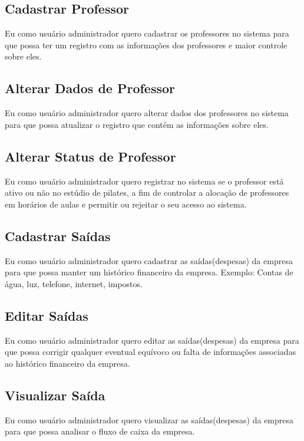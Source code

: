 \subsection[Cadastrar Professor]{Cadastrar Professor}
Eu como usuário administrador quero cadastrar os professores no sistema para
que possa ter um registro com as informações dos professores e maior controle
sobre eles.

\subsection[Alterar Dados de Professor]{Alterar Dados de Professor}
Eu como usuário administrador quero alterar dados dos professores no sistema
para que possa atualizar o registro que contém as informações sobre eles.

\subsection[Alterar Status de Professor]{Alterar Status de Professor}
Eu como usuário administrador quero registrar no sistema se o professor está
ativo ou não no estúdio de pilates, a fim de controlar a alocação de
professores em horários de aulas e permitir ou rejeitar o seu acesso ao sistema.

\subsection[Cadastrar Saídas]{Cadastrar Saídas}
Eu como usuário administrador quero cadastrar as saídas(despesas) da empresa para que
possa manter um histórico financeiro da empresa.
Exemplo: Contas de água, luz, telefone, internet, impostos.

\subsection[Editar Saídas]{Editar Saídas}
Eu como usuário administrador quero editar as saídas(despesas) da empresa para que possa
corrigir qualquer eventual equívoco ou falta de informações associadas ao
histórico financeiro da empresa.

\subsection[Visualizar Saída]{Visualizar Saída}
Eu como usuário administrador quero visualizar as saídas(despesas) da empresa
para que possa analisar o fluxo de caixa da empresa.

